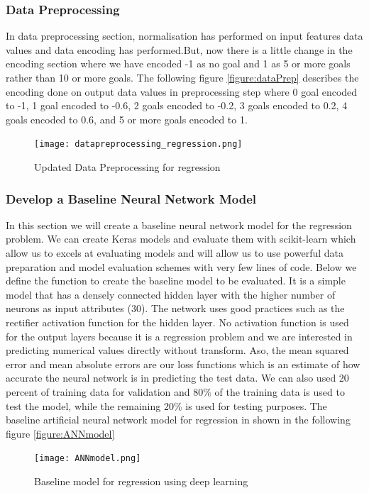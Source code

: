\subsubsection{Data Preprocessing}
In data preprocessing section, normalisation has performed on input features data values and data encoding has performed.But, now there is a little change in the encoding section where we have encoded -1 as no goal and 1 as 5 or more goals rather than 10 or more goals.\newline
The following figure \autoref{figure:dataPrep} describes the encoding done on output data values in preprocessing step where 0 goal encoded to -1, 1 goal encoded to -0.6, 2 goals encoded to -0.2, 3 goals encoded to 0.2, 4 goals encoded to 0.6, and 5 or more goals encoded to 1.\newline
\begin{figure}[H]
\begin{center}
\texttt{[image: datapreprocessing\_regression.png]}
\end{center}
\caption{Updated Data Preprocessing for regression }
\label{figure:dataPrep}
\end{figure}
\subsubsection{Develop a Baseline Neural Network Model}
In this section we will create a baseline neural network model for the regression problem. We can create Keras models and evaluate them with scikit-learn which allow us to excels at evaluating models and will allow us to use powerful data preparation and model evaluation schemes with very few lines of code.\newline
Below we define the function to create the baseline model to be evaluated. It is a simple model that has a densely connected hidden layer with the higher number of neurons as input attributes (30). The network uses good practices such as the rectifier activation function for the hidden layer. No activation function is used for the output layers because it is a regression problem and we are interested in predicting numerical values directly without transform.\newline
Aso, the mean squared error and mean absolute errors are our loss functions which is an estimate of how accurate the neural network is in predicting the test data. We can also used 20 percent of training data for validation and 80\% of the training data is used to test the model, while the remaining 20\% is used for testing purposes.\newline
The baseline artificial neural network model for regression in shown in the following figure \autoref{figure:ANNmodel} \newline
\begin{figure}[H]
\begin{center}
\texttt{[image: ANNmodel.png]}
\end{center}
\caption{Baseline model for regression using deep learning }
\label{figure:ANNmodel}
\end{figure}

